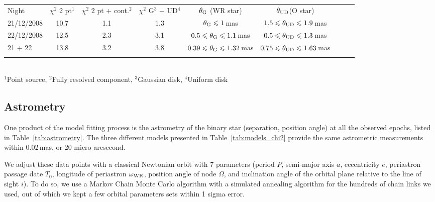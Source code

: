 \documentclass[usenatbib]{mnras}%
\begin{document}
\begin{table*}%
  \caption[]{Comparison between the AMBER data and several geometrical models in the continuum. The best-fit reduced $\chi^2$ is given for each case. The last line combines data from both nights. }
  \label{tab:models_chi2}
  \centering
    \begin{tabular}{lcccccccc}
    \hline
    \noalign{\smallskip}
    Night& $\chi^2$ 2 pt$^1$ & $\chi^2$ 2 pt + cont.$^2$  & $\chi^2$ G$^3$ + UD$^4$ & $\theta_{\rm G}$ (WR star) & $\theta_{\rm UD} $(O star) \\
    \noalign{\smallskip}
  \hline
    \noalign{\smallskip}
    21/12/2008 & 10.7 & 1.1 & 1.3 & $\theta_{\rm G} \leq 1$\,mas &  $1.5 \leq \theta_{\rm UD} \leq 1.9$\,mas \\
    22/12/2008 & 12.5 & 2.3 & 3.1 & $0.5 \leq \theta_{\rm G} \leq 1.1$\,mas & $0.5 \leq\theta_{\rm UD} \leq 1.3$\,mas\\
    21 + 22    & 13.8 & 3.2 & 3.8 & $0.39 \leq \theta_{\rm G} \leq 1.32$\,mas & $0.75 \leq  \theta_{\rm UD} \leq 1.63$\,mas\\
   \noalign{\smallskip}
    \hline
  \end{tabular}\\
  $^1$Point source, $^2$Fully resolved component, $^3$Gaussian disk, $^4$Uniform disk
\end{table*}




\subsection{Astrometry}

One product of the model fitting process is the astrometry of the binary star (separation, position angle) at all the observed epochs, listed in Table~\ref{tab:astrometry}. The three different models presented in Table~\ref{tab:models_chi2} provide the same astrometric measurements within 0.02\,mas, or 20 micro-arcsecond.

We adjust these data points with a classical Newtonian orbit with 7 parameters (period $P$, semi-major axis $a$, eccentricity $e$, periastron passage date $T_0$, longitude of periastron $\omega_{\rm WR}$, position angle of node $\Omega$, and inclination angle of the orbital plane relative to the line of sight $i$). To do so, we use a Markov Chain Monte Carlo algorithm with a simulated annealing algorithm for the hundreds of chain links we used, out of which we kept a few orbital parameters sets within 1 sigma error.
\end{document}
